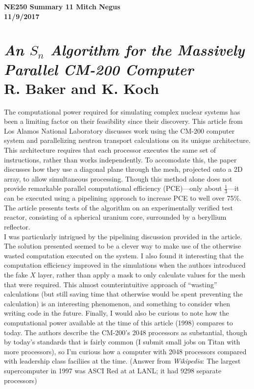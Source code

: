 \documentclass{report}
\newcommand{\tab}{\-\hspace{1cm}}
\begin{document}
\thispagestyle{empty}

{\bf {\large {NE250 Summary 11} \hfill Mitch Negus\\
		\hspace*{\fill} 11/9/2017\\ }}
\section*{\textsl{An $S_n$ Algorithm for the Massively Parallel CM-200 Computer} \\ \normalsize R. Baker and K. Koch}

\tab The computational power required for simulating complex nuclear systems has been a limiting factor on their feasibility since their discovery. This article from Los Alamos National Laboratory discusses work using the CM-200 computer system and parallelizing neutron transport calculations on its unique architecture. This architecture requires that each processor executes the same  set of instructions, rather than works independently. To accomodate this, the paper discusses how they use a diagonal plane through the mesh, projected onto a 2D array, to allow simultaneous processing. Though this method alone does not provide remarkable parallel computational efficiency (PCE)---only about $\frac{1}{3}$---it can be executed using a pipelining approach to increase PCE to well over 75\%. The article presents tests of the algorithm on an experimentally verified test reactor, consisting of a spherical uranium core, surrounded by a beryllium reflector. \\
\tab I was particularly intrigued by the pipelining discussion provided in the article. The solution presented seemed to be a clever way to make use of the otherwise wasted computation executed on the system. I also found it interesting that the computation efficiency improved in the simulations when the authors introduced the fake $X$ layer, rather than apply a mask to only calculate values for the mesh that were required. This almost counterintuitive approach of ``wasting'' calculations (but still saving time that otherwise would be spent preventing the calculation) is an interesting  phenomenon, and something to consider when writing code in the future. Finally, I would also be curious to note how the computational power available at the time of this article (1998) compares to today. The authors describe the CM-200's 2048 processors as substantial, though by today's standards that is fairly common (I submit small jobs on Titan with more processors), so I'm curious how a computer with 2048 processors compared with leadership class faciliies at the time. (Answer from \textsl{Wikipedia}: The largest supercomputer in 1997 was ASCI Red at at LANL; it had 9298 separate processors)
\end{document}

